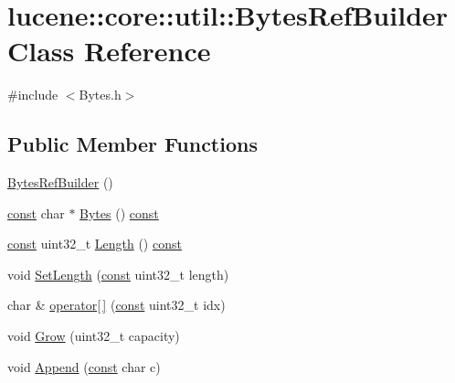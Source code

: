\hypertarget{classlucene_1_1core_1_1util_1_1BytesRefBuilder}{}\section{lucene\+:\+:core\+:\+:util\+:\+:Bytes\+Ref\+Builder Class Reference}
\label{classlucene_1_1core_1_1util_1_1BytesRefBuilder}


{\ttfamily \#include $<$Bytes.\+h$>$}

\subsection*{Public Member Functions}
\begin{DoxyCompactItemize}
\item 
\mbox{\hyperlink{classlucene_1_1core_1_1util_1_1BytesRefBuilder_aa5856f8432f1ec902dec8878870172a1}{Bytes\+Ref\+Builder}} ()
\item 
\mbox{\hyperlink{ZlibCrc32_8h_a2c212835823e3c54a8ab6d95c652660e}{const}} char $\ast$ \mbox{\hyperlink{classlucene_1_1core_1_1util_1_1BytesRefBuilder_adfb83526efdddf117d04ca09ee969a60}{Bytes}} () \mbox{\hyperlink{ZlibCrc32_8h_a2c212835823e3c54a8ab6d95c652660e}{const}}
\item 
\mbox{\hyperlink{ZlibCrc32_8h_a2c212835823e3c54a8ab6d95c652660e}{const}} uint32\+\_\+t \mbox{\hyperlink{classlucene_1_1core_1_1util_1_1BytesRefBuilder_aa7bd448382bd0a354c6f6ba60a59e8ac}{Length}} () \mbox{\hyperlink{ZlibCrc32_8h_a2c212835823e3c54a8ab6d95c652660e}{const}}
\item 
void \mbox{\hyperlink{classlucene_1_1core_1_1util_1_1BytesRefBuilder_a34ba90028288970e12074c73f83fac35}{Set\+Length}} (\mbox{\hyperlink{ZlibCrc32_8h_a2c212835823e3c54a8ab6d95c652660e}{const}} uint32\+\_\+t length)
\item 
char \& \mbox{\hyperlink{classlucene_1_1core_1_1util_1_1BytesRefBuilder_aa071988e7fc86a21eb471e1e1d7175c5}{operator\mbox{[}$\,$\mbox{]}}} (\mbox{\hyperlink{ZlibCrc32_8h_a2c212835823e3c54a8ab6d95c652660e}{const}} uint32\+\_\+t idx)
\item 
void \mbox{\hyperlink{classlucene_1_1core_1_1util_1_1BytesRefBuilder_a2a7eb7513a56413771e240c119d6f5df}{Grow}} (uint32\+\_\+t capacity)
\item 
void \mbox{\hyperlink{classlucene_1_1core_1_1util_1_1BytesRefBuilder_a8bd34d12e0ae6cac0ae2e44d6c127102}{Append}} (\mbox{\hyperlink{ZlibCrc32_8h_a2c212835823e3c54a8ab6d95c652660e}{const}} char c)

\end{DoxyCompactItemize}
